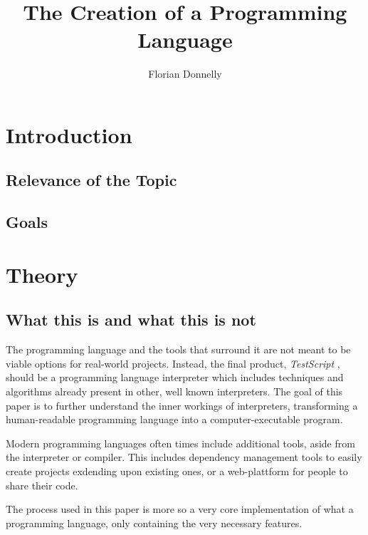 \documentclass[12pt,a4paper]{report}
\author{Florian Donnelly}
\title{The Creation of a Programming Language}
\begin{document}
\maketitle\tableofcontents\newpage


\newcommand{\name}{\emph{TestScript }}

\section{Introduction}
\subsection{Relevance of the Topic}
\subsection{Goals}

\section{Theory}
\subsection{What this is and what this is not}
The programming language and the tools that surround it are not meant to be
viable options for real-world projects. Instead, the final product, \name,
should be a programming language interpreter which includes techniques and
algorithms already present in other, well known interpreters.
The goal of this paper is to further understand the inner workings of
interpreters, transforming a human-readable programming language
into a computer-executable program.

Modern programming languages often times include additional tools, aside from
the interpreter or compiler. This includes dependency management tools to
easily create projects exdending upon existing ones, or a web-plattform for
people to share their code.

The process used in this paper is more so a very core implementation of what
a programming language, only containing the very necessary features.
\end{document}
